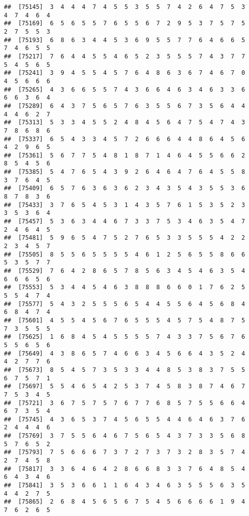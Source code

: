 \documentclass[
]{book}
\begin{document}
\begin{verbatim}
##  [75145]  3  4  4  4  7  4  5  5  3  5  5  7  4  2  6  4  7  5  3  4  7  4  6  4
##  [75169]  6  5  6  5  5  7  6  5  5  6  7  2  9  5  3  7  5  7  5  2  7  5  5  3
##  [75193]  6  8  6  3  4  4  5  3  6  9  5  5  7  7  6  4  6  6  5  7  4  6  5  5
##  [75217]  7  6  4  4  5  5  4  6  5  2  3  5  5  5  7  4  3  7  7  5  4  5  6  5
##  [75241]  3  9  4  5  5  4  5  7  6  4  8  6  3  6  7  4  6  7  0  4  5  6  6  6
##  [75265]  4  3  6  6  5  5  7  4  3  6  6  4  6  3  4  6  3  3  6  6  6  3  6  4
##  [75289]  6  4  3  7  5  6  5  7  6  3  5  5  6  7  3  5  6  4  4  4  4  6  2  7
##  [75313]  5  3  3  4  5  5  2  4  8  4  5  6  4  7  5  4  7  4  3  7  8  6  8  6
##  [75337]  6  5  4  3  3  4  5  7  2  6  6  6  4  4  8  6  4  5  6  4  2  9  6  5
##  [75361]  5  6  7  7  5  4  8  1  8  7  1  4  6  4  5  5  6  6  2  8  5  4  5  6
##  [75385]  5  4  7  6  5  4  3  9  2  6  4  6  4  7  6  4  5  5  8  3  7  6  4  5
##  [75409]  6  5  7  6  3  6  3  6  2  3  4  3  5  4  3  5  5  3  6  8  7  8  3  6
##  [75433]  3  7  6  5  4  5  3  1  4  3  5  7  6  1  5  3  5  2  3  3  5  3  6  4
##  [75457]  5  3  6  3  4  4  6  7  3  3  7  5  3  4  6  3  5  4  7  2  4  6  4  5
##  [75481]  5  9  6  5  4  7  5  2  7  6  5  3  3  5  5  5  4  2  2  2  3  4  5  7
##  [75505]  8  5  5  6  5  5  5  5  4  6  1  2  5  6  5  5  8  6  6  5  3  5  7  7
##  [75529]  7  6  4  2  8  6  5  7  8  5  6  3  4  5  4  6  3  5  4  6  6  6  5  6
##  [75553]  5  3  4  4  5  4  6  3  8  8  8  6  6  0  1  7  6  2  5  5  5  4  7  4
##  [75577]  5  4  3  2  5  5  5  6  5  4  4  5  5  6  4  5  6  8  4  6  8  4  7  4
##  [75601]  4  5  5  4  5  6  7  6  5  5  5  4  5  7  5  4  8  7  5  7  3  5  5  5
##  [75625]  1  6  8  4  5  4  5  5  5  5  7  4  3  3  7  5  6  7  6  5  5  6  5  6
##  [75649]  4  3  8  6  5  7  4  6  6  3  4  5  6  6  4  3  5  2  4  4  2  7  7  6
##  [75673]  8  5  4  5  7  3  5  3  3  4  4  8  5  3  8  3  7  5  5  6  7  5  7  1
##  [75697]  5  5  4  6  5  4  2  5  3  7  4  5  8  3  8  7  4  6  7  7  5  3  4  5
##  [75721]  3  6  7  5  7  5  7  6  7  7  6  8  5  7  5  5  6  6  4  6  7  3  5  4
##  [75745]  4  3  6  5  3  7  4  5  6  5  5  4  4  6  4  6  3  7  6  2  4  4  4  6
##  [75769]  3  7  5  5  6  4  6  7  5  6  5  4  3  7  3  3  5  6  8  5  7  6  5  2
##  [75793]  7  5  6  6  6  7  3  7  2  7  3  7  3  2  8  3  5  7  4  2  7  4  5  8
##  [75817]  3  3  6  4  6  4  2  8  6  6  8  3  3  7  6  4  8  5  4  6  4  3  4  6
##  [75841]  3  5  3  6  6  1  1  6  4  3  4  6  3  5  5  5  6  3  5  4  4  2  7  5
##  [75865]  2  6  8  4  5  6  5  6  7  5  4  5  6  6  6  6  1  9  4  7  6  2  6  5

\end{verbatim}
\end{document}
